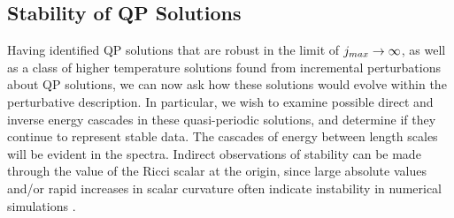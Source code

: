 \documentclass[../PhD.tex]{subfiles}
\begin{document}
\subsection{Stability of QP Solutions}

Having identified QP solutions that are robust in the limit of $j_{max} \to \infty$, as well as a class of higher temperature solutions found from incremental perturbations about QP solutions, we can now ask how these solutions would evolve within the perturbative description. In particular, we wish to examine possible direct and inverse energy cascades in these quasi-periodic solutions, and determine if they continue to represent stable data. The cascades of energy between length scales will be evident in the spectra. Indirect observations of stability can be made through the value of the Ricci scalar at the origin, since large absolute values and/or rapid increases in scalar curvature often indicate instability in numerical simulations \cite{1104.3702}. 
\end{document}
